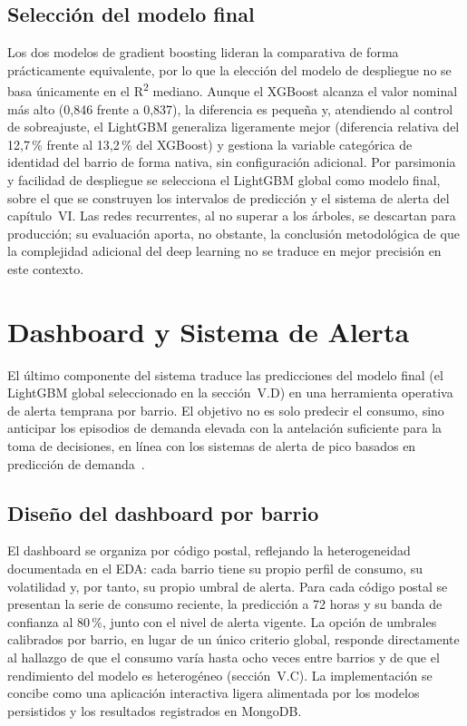 \documentclass[12pt, a4paper]{article}
\begin{document}
\subsection{Selección del modelo final}

Los dos modelos de gradient boosting lideran la comparativa de forma prácticamente equivalente, por lo que la elección del modelo de despliegue no se basa únicamente en el R\textsuperscript{2} mediano. Aunque el XGBoost alcanza el valor nominal más alto (0,846 frente a 0,837), la diferencia es pequeña y, atendiendo al control de sobreajuste, el LightGBM generaliza ligeramente mejor (diferencia relativa del 12,7\,\% frente al 13,2\,\% del XGBoost) y gestiona la variable categórica de identidad del barrio de forma nativa, sin configuración adicional. Por parsimonia y facilidad de despliegue se selecciona el LightGBM global como modelo final, sobre el que se construyen los intervalos de predicción y el sistema de alerta del capítulo~VI. Las redes recurrentes, al no superar a los árboles, se descartan para producción; su evaluación aporta, no obstante, la conclusión metodológica de que la complejidad adicional del deep learning no se traduce en mejor precisión en este contexto.


\section{Dashboard y Sistema de Alerta}

El último componente del sistema traduce las predicciones del modelo final (el LightGBM global seleccionado en la sección~V.D) en una herramienta operativa de alerta temprana por barrio. El objetivo no es solo predecir el consumo, sino anticipar los episodios de demanda elevada con la antelación suficiente para la toma de decisiones, en línea con los sistemas de alerta de pico basados en predicción de demanda~\cite{yasuhiro2020}.

\subsection{Diseño del dashboard por barrio}

El dashboard se organiza por código postal, reflejando la heterogeneidad documentada en el EDA: cada barrio tiene su propio perfil de consumo, su volatilidad y, por tanto, su propio umbral de alerta. Para cada código postal se presentan la serie de consumo reciente, la predicción a 72 horas y su banda de confianza al 80\,\%, junto con el nivel de alerta vigente. La opción de umbrales calibrados por barrio, en lugar de un único criterio global, responde directamente al hallazgo de que el consumo varía hasta ocho veces entre barrios y de que el rendimiento del modelo es heterogéneo (sección~V.C). La implementación se concibe como una aplicación interactiva ligera alimentada por los modelos persistidos y los resultados registrados en MongoDB.
\end{document}
